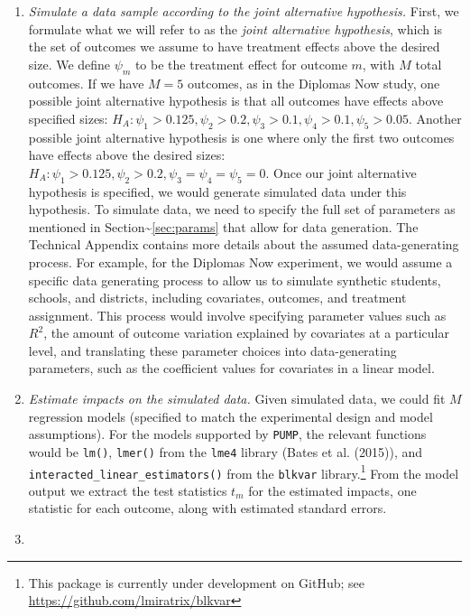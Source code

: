 \documentclass[
]{article}
\begin{document}
\begin{enumerate}
\def\labelenumi{\arabic{enumi}.}
\item
  \emph{Simulate a data sample according to the joint alternative
  hypothesis.} First, we formulate what we will refer to as the
  \emph{joint alternative hypothesis}, which is the set of outcomes we
  assume to have treatment effects above the desired size. We define
  \(\psi_m\) to be the treatment effect for outcome \(m\), with \(M\)
  total outcomes. If we have \(M = 5\) outcomes, as in the Diplomas Now
  study, one possible joint alternative hypothesis is that all outcomes
  have effects above specified sizes:
  \(H_A: \psi_1 > 0.125, \psi_2 > 0.2, \psi_3 > 0.1, \psi_4 > 0.1, \psi_5 > 0.05\).
  Another possible joint alternative hypothesis is one where only the
  first two outcomes have effects above the desired sizes:
  \(H_A: \psi_1 > 0.125, \psi_2 > 0.2, \psi_3 = \psi_4 = \psi_5 = 0\).
  Once our joint alternative hypothesis is specified, we would generate
  simulated data under this hypothesis. To simulate data, we need to
  specify the full set of parameters as mentioned in
  Section\textasciitilde{}\ref{sec:params} that allow for data
  generation. The Technical Appendix contains more details about the
  assumed data-generating process. For example, for the Diplomas Now
  experiment, we would assume a specific data generating process to
  allow us to simulate synthetic students, schools, and districts,
  including covariates, outcomes, and treatment assignment. This process
  would involve specifying parameter values such as \(R^2\), the amount
  of outcome variation explained by covariates at a particular level,
  and translating these parameter choices into data-generating
  parameters, such as the coefficient values for covariates in a linear
  model.
\item
  \emph{Estimate impacts on the simulated data.} Given simulated data,
  we could fit \(M\) regression models (specified to match the
  experimental design and model assumptions). For the models supported
  by \texttt{PUMP}, the relevant functions would be \texttt{lm()},
  \texttt{lmer()} from the \texttt{lme4} library (Bates et al. (2015)),
  and \texttt{interacted\_linear\_estimators()} from the \texttt{blkvar}
  library.\footnote{This package is currently under development on GitHub; see \url{https://github.com/lmiratrix/blkvar}}
  From the model output we extract the test statistics \(t_m\) for the
  estimated impacts, one statistic for each outcome, along with
  estimated standard errors.
\item

\end{enumerate}
\end{document}
